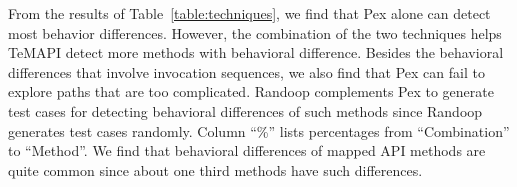 From the results of Table~\ref{table:techniques}, we find that Pex alone can detect most behavior differences. However, the combination of the two techniques helps TeMAPI detect more methods with behavioral difference. Besides the behavioral differences that involve invocation sequences, we also find that Pex can fail to explore paths that are too complicated. Randoop complements Pex to generate test cases for detecting behavioral differences of such methods since Randoop generates test cases randomly. Column ``\%'' lists percentages from ``Combination'' to ``Method''. We find that behavioral differences of mapped API methods are quite common since about one third methods have such differences.

%
%
